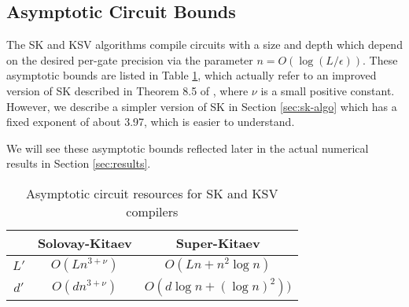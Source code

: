 \subsection{Asymptotic Circuit Bounds}

The SK and KSV algorithms compile circuits with
a size and depth which depend on the desired per-gate precision via the
parameter $n = O(\log(L/\epsilon))$. These asymptotic bounds are listed in
Table \ref{tab:asymptotics}, which actually refer to an improved version of
SK described in Theorem 8.5 of \cite{ksv02}, where 
$\nu$ is a small positive constant.
However, we describe a simpler version of SK in Section \ref{sec:sk-algo}
which has a fixed exponent of about 3.97, which is easier to understand.

We will see these asymptotic bounds reflected
later in the actual numerical results in Section \ref{sec:results}.

\begin{center}
\begin{table}
\label{tab:asymptotics}
\begin{tabular}{|c|c|c|}
\hline
   & Solovay-Kitaev & Super-Kitaev\\
\hline
$L'$ & $O(Ln^{3+\nu})$ & $O(Ln + n^2 \log n)$\\
$d'$ & $O(dn^{3+\nu})$ & $O(d \log{n} + (\log{n})^2))$\\ 
\hline
\end{tabular}
\caption{Asymptotic circuit resources for SK and KSV compilers}
\end{table}
\end{center}